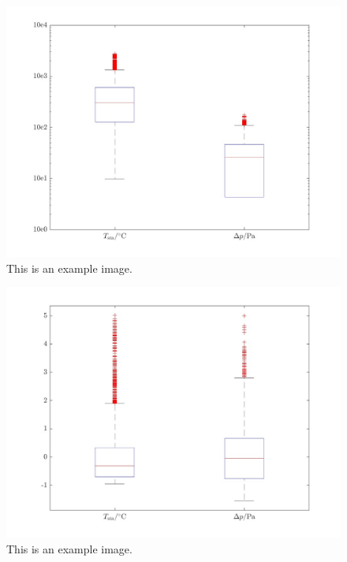         \begin{figure}[H]
            \centering
            \includegraphics[width=1\textwidth]{00_Images/00_Small_Stack_Images/00_Combined_Boxplot_Outputs_July_10_2024_v1.jpg}  %
            \caption{This is an example image.}
            \label{fig:example1}
        \end{figure}

        \begin{figure}[H]
            \centering
            \includegraphics[width=1\textwidth]{00_Images/00_Small_Stack_Images/00_Combined_Boxplot_Normalized_Outputs_July_10_2024_v1.jpg}  %
            \caption{This is an example image.}
            \label{fig:example1}
        \end{figure}

